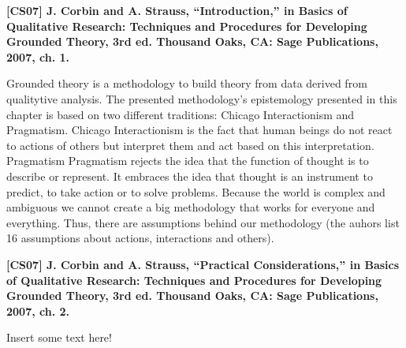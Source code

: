 \documentclass[a4paper,12pt,english]{scrartcl}
\newcommand{\papertitle}[2]{
	\noindent
	\textbf{\textsf{{\large
		[#1] #2
	}}}
	\vspace{2mm}
}
\begin{document}
\pagestyle{fancy} %

\papertitle{CS07}{J. Corbin and A. Strauss, \enquote{Introduction,} in Basics of Qualitative Research: Techniques and Procedures for Developing Grounded Theory, 3rd ed. Thousand Oaks, CA: Sage Publications, 2007, ch. 1.}


Grounded theory is a methodology to build theory from data derived from
qualitytive analysis. The presented methodology's epistemology presented in this
chapter is based on two different traditions: Chicago Interactionism and
Pragmatism. Chicago Interactionism is the fact that human beings do not react to
actions of others but interpret them and act based on this interpretation.
Pragmatism Pragmatism rejects the idea that the function of thought is to
describe or represent. It embraces the idea that thought is an instrument to
predict, to take action or to solve problems. Because the world is complex and
ambiguous we cannot create a big methodology that works for everyone and
everything. Thus, there are assumptions behind our methodology (the auhors list
16 assumptions about actions, interactions and others).

\vspace{8mm}

\papertitle{CS07}{J. Corbin and A. Strauss, \enquote{Practical Considerations,} in Basics of Qualitative Research: Techniques and Procedures for Developing Grounded Theory, 3rd ed. Thousand Oaks, CA: Sage Publications, 2007, ch. 2.}

Insert some text here!
\end{document}
